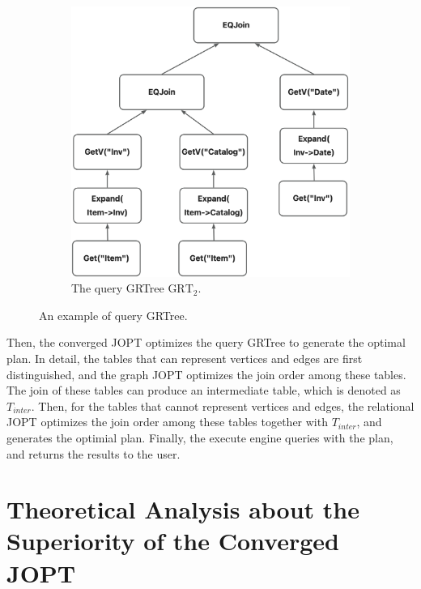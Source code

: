 \documentclass[sigconf, nonacm]{acmart}
\begin{document}
\begin{figure}
\begin{subfigure}[b]{0.35\linewidth}
    \end{subfigure}
    \begin{subfigure}[b]{0.3\linewidth}
        \centering
        \includegraphics[width=\linewidth]{./figures/query-grtree-2.png}
        \caption{The query GRTree $\text{GRT}_2$.}
        \label{fig:query-grtree-2}
    \end{subfigure}
    \caption{An example of query GRTree.}
    \label{fig:query-grtree-example}
\end{figure}

Then, the converged JOPT optimizes the query GRTree to generate the optimal plan.
In detail, the tables that can represent vertices and edges are first distinguished, and the graph JOPT optimizes the join order among these tables.
The join of these tables can produce an intermediate table, which is denoted as $T_{inter}$.
Then, for the tables that cannot represent vertices and edges, the relational JOPT optimizes the join order among these tables together with $T_{inter}$, and generates the optimial plan.
Finally, the execute engine queries with the plan, and returns the results to the user.



\section{Theoretical Analysis about the Superiority of the Converged JOPT}
\label{sec:theoretical-analysis}
\end{document}
